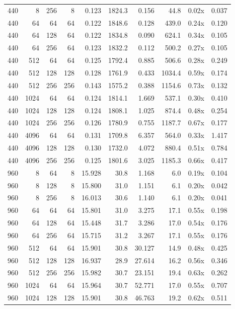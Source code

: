 {\begin{longtable}{rrrrrrrrrr}
440 & 8 & 256 & 8 & 0.123 & 1824.3 & 0.156 & 44.8 & 0.02x & 0.037\\
440 & 64 & 64 & 64 & 0.122 & 1848.6 & 0.128 & 439.0 & 0.24x & 0.120\\
440 & 64 & 128 & 64 & 0.122 & 1834.8 & 0.090 & 624.1 & 0.34x & 0.105\\
440 & 64 & 256 & 64 & 0.123 & 1832.2 & 0.112 & 500.2 & 0.27x & 0.105\\
440 & 512 & 64 & 64 & 0.125 & 1792.4 & 0.885 & 506.6 & 0.28x & 0.249\\
440 & 512 & 128 & 128 & 0.128 & 1761.9 & 0.433 & 1034.4 & 0.59x & 0.174\\
440 & 512 & 256 & 256 & 0.143 & 1575.2 & 0.388 & 1154.6 & 0.73x & 0.132\\
440 & 1024 & 64 & 64 & 0.124 & 1814.1 & 1.669 & 537.1 & 0.30x & 0.410\\
440 & 1024 & 128 & 128 & 0.124 & 1808.1 & 1.025 & 874.4 & 0.48x & 0.254\\
440 & 1024 & 256 & 256 & 0.126 & 1780.9 & 0.755 & 1187.7 & 0.67x & 0.177\\
440 & 4096 & 64 & 64 & 0.131 & 1709.8 & 6.357 & 564.0 & 0.33x & 1.417\\
440 & 4096 & 128 & 128 & 0.130 & 1732.0 & 4.072 & 880.4 & 0.51x & 0.784\\
440 & 4096 & 256 & 256 & 0.125 & 1801.6 & 3.025 & 1185.3 & 0.66x & 0.417\\
960 & 8 & 64 & 8 & 15.928 & 30.8 & 1.168 & 6.0 & 0.19x & 0.104\\
960 & 8 & 128 & 8 & 15.800 & 31.0 & 1.151 & 6.1 & 0.20x & 0.042\\
960 & 8 & 256 & 8 & 16.013 & 30.6 & 1.140 & 6.1 & 0.20x & 0.041\\
960 & 64 & 64 & 64 & 15.801 & 31.0 & 3.275 & 17.1 & 0.55x & 0.198\\
960 & 64 & 128 & 64 & 15.448 & 31.7 & 3.286 & 17.0 & 0.54x & 0.176\\
960 & 64 & 256 & 64 & 15.715 & 31.2 & 3.267 & 17.1 & 0.55x & 0.176\\
960 & 512 & 64 & 64 & 15.901 & 30.8 & 30.127 & 14.9 & 0.48x & 0.425\\
960 & 512 & 128 & 128 & 16.937 & 28.9 & 27.614 & 16.2 & 0.56x & 0.346\\
960 & 512 & 256 & 256 & 15.982 & 30.7 & 23.151 & 19.4 & 0.63x & 0.262\\
960 & 1024 & 64 & 64 & 15.964 & 30.7 & 52.771 & 17.0 & 0.55x & 0.707\\
960 & 1024 & 128 & 128 & 15.901 & 30.8 & 46.763 & 19.2 & 0.62x & 0.511\\

\end{longtable}}
